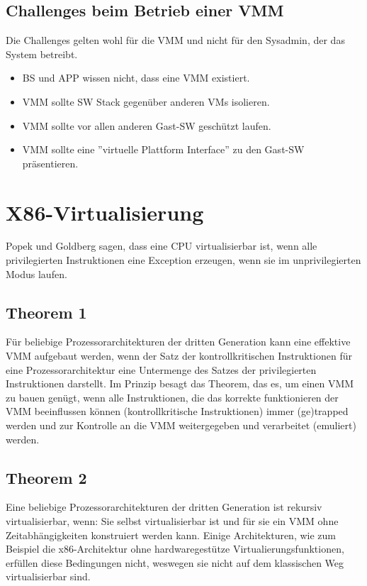 \subsection{Challenges beim Betrieb einer VMM}
Die Challenges gelten wohl für die VMM und nicht für den Sysadmin, der das System betreibt.
\begin{itemize}
	\item BS und APP wissen nicht, dass eine VMM existiert.
	\item VMM sollte SW Stack gegenüber anderen VMs isolieren.
	\item VMM sollte vor allen anderen Gast-SW geschützt laufen.
	\item VMM sollte eine ''virtuelle Plattform Interface'' zu den Gast-SW präsentieren.
\end{itemize}

\newpage
\section{X86-Virtualisierung}
Popek und Goldberg sagen, dass eine CPU virtualisierbar ist, wenn alle privilegierten Instruktionen eine Exception erzeugen, wenn sie im unprivilegierten Modus laufen.

\subsection{Theorem 1}
\label{sec:poppek-goldberg-theorem1}
Für beliebige Prozessorarchitekturen der dritten Generation kann
eine effektive VMM aufgebaut werden, wenn der Satz der
kontrollkritischen Instruktionen für eine Prozessorarchitektur
eine Untermenge des Satzes der privilegierten Instruktionen
darstellt.
Im Prinzip besagt das Theorem, das es, um einen VMM zu bauen
genügt, wenn alle Instruktionen, die das korrekte funktionieren
der VMM beeinflussen können (kontrollkritische Instruktionen)
immer (ge)trapped werden und zur Kontrolle an die VMM
weitergegeben und verarbeitet (emuliert) werden.

\subsection{Theorem 2}
Eine beliebige Prozessorarchitekturen der dritten Generation ist
rekursiv virtualisierbar, wenn: Sie selbst virtualisierbar ist und für sie ein VMM ohne Zeitabhängigkeiten konstruiert werden
kann.
Einige Architekturen, wie zum Beispiel die x86-Architektur ohne
hardwaregestütze Virtualierungsfunktionen, erfüllen diese
Bedingungen nicht, weswegen sie nicht auf dem klassischen Weg
virtualisierbar sind.

